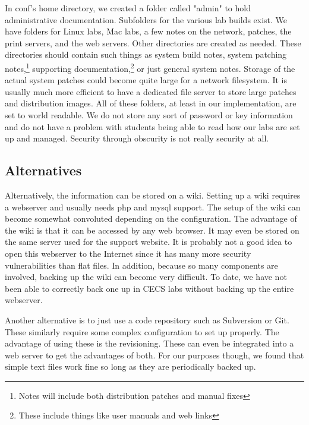 In conf's home directory, we created a folder called "admin" to hold administrative documentation.  Subfolders for the various lab builds exist.  We have folders for Linux labs, Mac labs, a few notes on the network, patches, the print servers, and the web servers.  Other directories are created as needed.  These directories should contain such things as system build notes, system patching notes,\footnote{Notes will include both distribution patches and manual fixes} supporting documentation,\footnote{These include things like user manuals and web links} or just general system notes.  Storage of the actual system patches could become quite large for a network filesystem.  It is usually much more efficient to have a dedicated file server to store large patches and distribution images.  All of these folders, at least in our implementation, are set to world readable.  We do not store any sort of password or key information and do not have a problem with students being able to read how our labs are set up and managed.  Security through obscurity is not really security at all.  
\subsection{Alternatives}
Alternatively, the information can be stored on a wiki.  Setting up a wiki requires a webserver and usually needs php and mysql support.  The setup of the wiki can become somewhat convoluted depending on the configuration.  The advantage of the wiki is that it can be accessed by any web browser.  It may even be stored on the same server used for the support website.  It is probably not a good idea to open this webserver to the Internet since it has many more security vulnerabilities than flat files.  In addition, because so many components are involved, backing up the wiki can become very difficult.  To date, we have not been able to correctly back one up in CECS labs without backing up the entire webserver.  

Another alternative is to just use a code repository such as Subversion or Git.  These similarly require some complex configuration to set up properly.  The advantage of using these is the revisioning.  These can even be integrated into a web server to get the advantages of both.  For our purposes though, we found that simple text files work fine so long as they are periodically backed up.  
